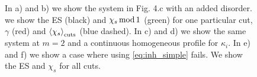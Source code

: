 \documentclass[twocolumn,amsmath,longbibliography,amssymb,superscriptaddress]{revtex4-1}
\begin{document}
\begin{figure}[h!]
\caption{In a) and b) we show the system in Fig. 4.c with an added disorder. we show the ES (black) and $ \chi_s \, {\rm mod} \, 1$ (green) for one particular cut,$\gamma$ (red) and $\expval{\chi_s}_{\rm cuts}$ (blue dashed). In c) and d) we show the same system at $m=2$ and a continuous homogeneous profile for $\kappa_i$. In e) and f) we show a case where using \eqref{eq:inh_simple} fails. We show the ES and $\chi_s$ for all cuts. }
\label{fig:simple_inh}
\end{figure}
\end{document}
